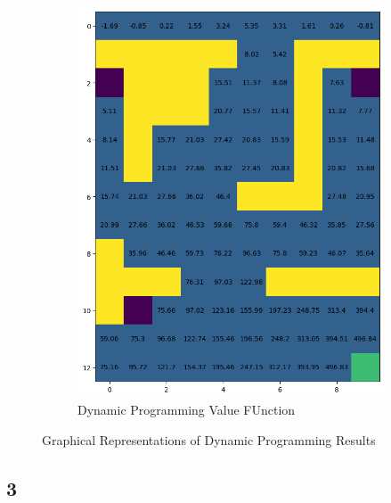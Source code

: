 \begin{figure}[H]
\begin{subfigure}[b]{0.49\textwidth}
        \includegraphics[width=\textwidth]{assets/dp/dp_value_function.png}        
        \caption{Dynamic Programming Value FUnction}
    \end{subfigure}
    \caption*{Graphical Representations of Dynamic Programming Results}
\end{figure} 

\subsection*{3}

